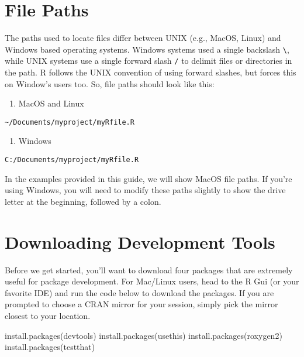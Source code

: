 \documentclass[
]{book}
\newenvironment{Shaded}{\begin{snugshade}}{\end{snugshade}}
\newcommand{\FunctionTok}[1]{\textcolor[rgb]{0.00,0.00,0.00}{#1}}
\newcommand{\NormalTok}[1]{#1}
\newcommand{\StringTok}[1]{\textcolor[rgb]{0.31,0.60,0.02}{#1}}
\providecommand{\tightlist}{%
  \setlength{\itemsep}{0pt}\setlength{\parskip}{0pt}}
\begin{document}
\hypertarget{file-paths}{%
\section{File Paths}\label{file-paths}}

The paths used to locate files differ between UNIX (e.g., MacOS, Linux) and Windows based operating systems. Windows systems used a single backslash \texttt{\textbackslash{}}, while UNIX systems use a single forward slash \texttt{/} to delimit files or directories in the path. R follows the UNIX convention of using forward slashes, but forces this on Window's users too. So, file paths should look like this:

\begin{enumerate}
\def\labelenumi{\arabic{enumi}.}
\tightlist
\item
  MacOS and Linux
\end{enumerate}

\texttt{\textasciitilde{}/Documents/myproject/myRfile.R}

\begin{enumerate}
\def\labelenumi{\arabic{enumi}.}
\setcounter{enumi}{1}
\tightlist
\item
  Windows
\end{enumerate}

\texttt{C:/Documents/myproject/myRfile.R}

In the examples provided in this guide, we will show MacOS file paths. If you're using Windows, you will need to modify these paths slightly to show the drive letter at the beginning, followed by a colon.

\hypertarget{downloading-development-tools}{%
\section{Downloading Development Tools}\label{downloading-development-tools}}

Before we get started, you'll want to download four packages that are extremely useful for package development. For Mac/Linux users, head to the R Gui (or your favorite IDE) and run the code below to download the packages. If you are prompted to choose a CRAN mirror for your session, simply pick the mirror closest to your location.

\begin{Shaded}
\begin{Highlighting}[]
\FunctionTok{install.packages}\NormalTok{(}\StringTok{\textquotesingle{}devtools\textquotesingle{}}\NormalTok{)}
\FunctionTok{install.packages}\NormalTok{(}\StringTok{\textquotesingle{}usethis\textquotesingle{}}\NormalTok{)}
\FunctionTok{install.packages}\NormalTok{(}\StringTok{\textquotesingle{}roxygen2\textquotesingle{}}\NormalTok{)}
\FunctionTok{install.packages}\NormalTok{(}\StringTok{\textquotesingle{}testthat\textquotesingle{}}\NormalTok{)}
\end{Highlighting}
\end{Shaded}
\end{document}
